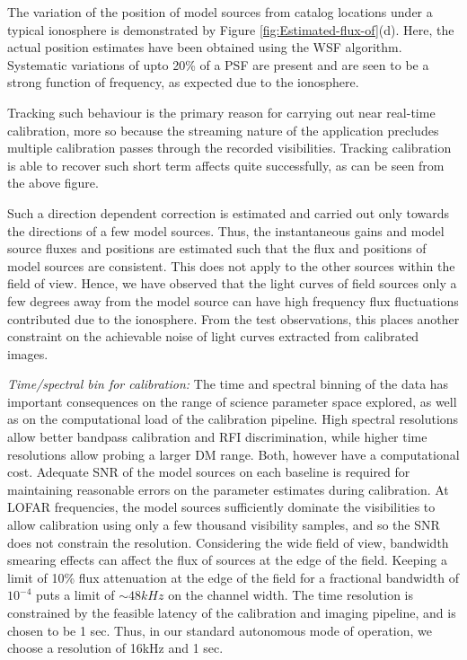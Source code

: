 \documentclass{aa}
\begin{document}
The variation  of the position of  model sources from catalog  locations under a
typical  ionosphere is  demonstrated  by Figure  \ref{fig:Estimated-flux-of}(d).
Here,  the  actual   position  estimates  have  been  obtained   using  the  WSF
algorithm. Systematic variations of upto 20\%  of a PSF are present and are seen
to be a strong function of frequency, as expected due to the ionosphere.




Tracking such  behaviour is the primary  reason for carrying  out near real-time
calibration, more so  because the streaming nature of  the application precludes
multiple  calibration   passes  through  the   recorded  visibilities.  Tracking
calibration is  able to recover such  short term affects  quite successfully, as
can be seen from the above figure.

Such a direction dependent correction  is estimated and carried out only towards
the directions of  a few model sources. Thus, the  instantaneous gains and model
source fluxes  and positions are estimated  such that the flux  and positions of
model sources  are consistent. This does  not apply to the  other sources within
the  field of  view. Hence,  we have  observed that  the light  curves  of field
sources only  a few degrees away from  the model source can  have high frequency
flux fluctuations contributed due to the ionosphere. From the test observations,
this places another constraint on the achievable noise of light curves extracted
from calibrated images.

\emph{Time/spectral bin for  calibration:} The time and spectral  binning of the
data  has  important  consequences  on  the range  of  science  parameter  space
explored, as well as on the computational load of the calibration pipeline. High
spectral resolutions  allow better bandpass calibration  and RFI discrimination,
while higher  time resolutions allow probing  a larger DM  range.  Both, however
have a computational cost. Adequate SNR of the model sources on each baseline is
required  for maintaining reasonable  errors on  the parameter  estimates during
calibration. At  LOFAR frequencies, the model sources  sufficiently dominate the
visibilities to allow calibration using  only a few thousand visibility samples,
and so the SNR does not constrain the resolution.  Considering the wide field of
view, bandwidth smearing  effects can affect the flux of sources  at the edge of
the field. Keeping a limit of 10\% flux attenuation at the edge of the field for
a fractional bandwidth of $10^{-4}$ puts  a limit of $\sim48 kHz$ on the channel
width.   The time  resolution  is constrained  by  the feasible  latency of  the
calibration  and imaging pipeline,  and is  chosen to  be 1  sec.  Thus,  in our
standard autonomous  mode of operation,  we choose a  resolution of 16kHz  and 1
sec.
\end{document}

